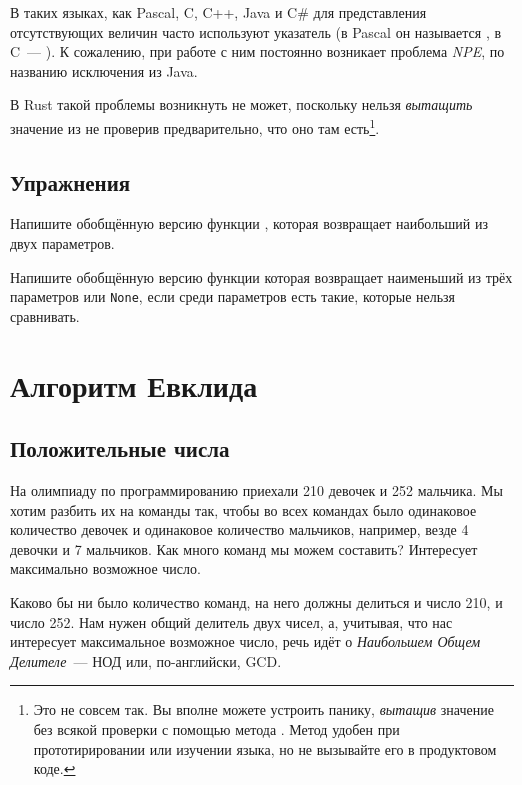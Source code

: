 В таких языках, как Pascal, C, C++, Java и C\# для представления отсутствующих величин часто используют указатель  (в Pascal он называется , в C~--- ).
К сожалению, при работе с ним постоянно возникает проблема {\em  NPE}, по названию исключения  из Java.

В Rust такой проблемы возникнуть не может, поскольку нельзя {\em вытащить} значение из  не проверив предварительно, что оно там есть\footnote{
  Это не совсем так.
  Вы вполне можете устроить панику, {\em вытащив} значение без всякой проверки с помощью метода .
  Метод удобен при прототирировании или изучении языка, но не вызывайте его в продуктовом коде.}.

\subsection {Упражнения}

\begin{Exercise}
  \Question
  Напишите обобщённую версию функции , которая возвращает наибольший из двух параметров.
\end{Exercise}
    
\begin{Exercise}
  \Question
  Напишите обобщённую версию функции  которая возвращает наименьший из трёх параметров или \texttt{None}, если среди параметров есть такие, которые нельзя сравнивать.
\end{Exercise}

\section{Алгоритм Евклида}

\subsection{Положительные числа}

\begin{Exercise}
  \Question
  На олимпиаду по программированию приехали 210 девочек и 252 мальчика.
  Мы хотим разбить их на команды так, чтобы во всех командах было одинаковое количество девочек и одинаковое количество мальчиков, например, везде 4 девочки и 7 мальчиков.
  Как много команд мы можем составить? Интересует максимально возможное число.
\end{Exercise}

Каково бы ни было количество команд, на него должны делиться и число 210, и число 252.
Нам нужен общий делитель двух чисел, а, учитывая, что нас интересует максимальное возможное число, речь идёт о {\em Наибольшем Общем Делителе}~--- НОД или, по-английски, GCD.

